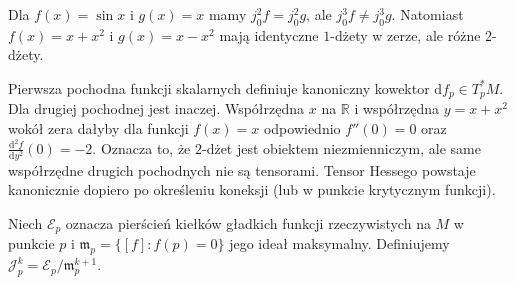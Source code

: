 \begin{przyklad}
\label{ex:dzety-taylor}
Dla $f(x)=\sin x$ i $g(x)=x$ mamy $j_0^2f=j_0^2g$,
ale $j_0^3f\ne j_0^3g$. Natomiast $f(x)=x+x^2$
i $g(x)=x-x^2$ mają identyczne $1$-dżety w zerze,
ale różne $2$-dżety.
\end{przyklad}

\begin{uwaga}
\label{rem:dzety-hess}
Pierwsza pochodna funkcji skalarnych definiuje kanoniczny
kowektor $\mathrm df_p\in T_p^*M$. Dla drugiej pochodnej jest inaczej.
Współrzędna $x$ na $\mathbb R$ i współrzędna $y=x+x^2$ wokół zera
dałyby dla funkcji $f(x)=x$ odpowiednio $f''(0)=0$
oraz $\frac{\mathrm d^2 f}{\mathrm dy^2}(0)=-2$.
Oznacza to, że $2$-dżet jest obiektem niezmienniczym,
ale same współrzędne drugich pochodnych nie są tensorami.
Tensor Hessego powstaje kanonicznie dopiero po określeniu
koneksji (lub w punkcie krytycznym funkcji).
\end{uwaga}

\begin{definicja}
\label{def:dzety-algebra}
Niech $\mathcal E_p$ oznacza pierścień kiełków gładkich
funkcji rzeczywistych na $M$ w punkcie $p$ i
$\mathfrak m_p=\{[f]:f(p)=0\}$ jego ideał maksymalny.
Definiujemy $\mathcal J_p^k=\mathcal E_p/\mathfrak m_p^{k+1}$.
\end{definicja}

